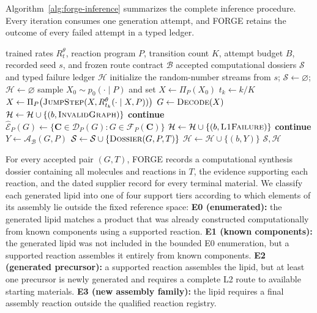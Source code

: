 \documentclass{article}
\begin{document}
Algorithm~\ref{alg:forge-inference} summarizes the complete inference procedure.
Every iteration consumes one generation attempt, and FORGE retains the outcome of every failed
attempt in a typed ledger.
\begin{algorithm}[t]
\caption{FORGE generation and fail-closed synthesis-program construction.}
\label{alg:forge-inference}
\begin{algorithmic}[1]
\Require trained rates $R_t^\theta$, reaction program $P$, transition count $K$, attempt budget $B$,
recorded seed $s$, and frozen route contract $\mathcal{B}$
\Ensure accepted computational dossiers $\mathcal{S}$ and typed failure ledger $\mathcal{H}$
\State initialize the random-number streams from $s$; $\mathcal{S}\gets\varnothing$;
$\mathcal{H}\gets\varnothing$
    \State sample $X_0\sim p_0(\cdot\mid P)$ and set $X\gets\Pi_P(X_0)$
        \State $t_k\gets k/K$
        \State $X\gets\Pi_P\!\left(\Call{JumpStep}{X,R_{t_k}^\theta(\cdot\mid X,P)}\right)$
    \EndFor
    \State $G\gets\Call{Decode}{X}$
        \State $\mathcal{H}\gets\mathcal{H}\cup\{(b,\textsc{InvalidGraph})\}$
        \State \textbf{continue}
    \EndIf
    \State $\widehat{\mathcal{E}}_P(G)\gets
    \{\mathbf{C}\in\mathcal{D}_P(G):G\in\mathcal{F}_P(\mathbf{C})\}$
        \State $\mathcal{H}\gets\mathcal{H}\cup\{(b,\textsc{L1Failure})\}$
        \State \textbf{continue}
    \EndIf
    \State $Y\gets\mathcal{A}_{\mathcal{B}}(G,P)$ 
        \State $\mathcal{S}\gets\mathcal{S}\cup\{\Call{Dossier}{G,P,T}\}$
    \Else
        \State $\mathcal{H}\gets\mathcal{H}\cup\{(b,Y)\}$ 
    \EndIf
\EndFor
\State \Return $\mathcal{S},\mathcal{H}$
\end{algorithmic}
\end{algorithm}

For every accepted pair $(G,T)$, FORGE records a computational synthesis dossier containing all
molecules and reactions in $T$, the evidence supporting each reaction, and the dated supplier record
for every terminal material.
We classify each generated lipid into one of four support tiers according to which elements of its
assembly lie outside the fixed reference space:
\textbf{E0 (enumerated):} the generated lipid matches a product that was already constructed
computationally from known components using a supported reaction.
\textbf{E1 (known components):} the generated lipid was not included in the bounded E0 enumeration,
but a supported reaction assembles it entirely from known components.
\textbf{E2 (generated precursor):} a supported reaction assembles the lipid, but at least one
precursor is newly generated and requires a complete L2 route to available starting materials.
\textbf{E3 (new assembly family):} the lipid requires a final assembly reaction outside the
qualified reaction registry.
\end{document}
